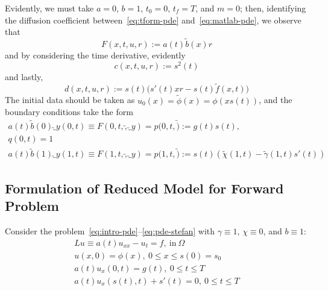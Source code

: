 \documentclass[letterpaper, 10pt]{amsart}
\theoremstyle{definition}
\theoremstyle{remark}
\newcommand{\D}[2]{\frac{\partial{} #1}{\partial{} #2}}
\begin{document}
Evidently, we must take $a=0$, $b=1$, $t_0=0$, $t_f = T$, and $m=0$; %
then, identifying the diffusion coefficient between~\eqref{eq:tform-pde} and~\eqref{eq:matlab-pde}, we observe that
\[
  F(x, t, u, r) := a(t) \tilde{b}(x) r
\]
and by considering the time derivative, evidently
\[
  c(x, t, u, r) := s^2(t)
\]
and lastly,
\[
  d(x, t, u, r) := s(t) \big(s'(t) x r - s(t) \tilde{f}(x,t)\big)
\]
The initial data should be taken as $u_0(x) = \tilde{\phi}(x) = \phi(x s(t))$, and the boundary conditions take the form
\begin{gather*}
  a(t)\tilde{b}(0) \utilde_y(0,t) \equiv F(0, t, \utilde, \utilde_y)
  = p(0,t,\utilde):=g(t) s(t),
  \\
  q(0,t)=1
  \\
  a(t)\tilde{b}(1) \utilde_y(1,t) \equiv F(1, t, \utilde, \utilde_y)
  = p(1,t,\utilde)
  := s(t)\left(
    \tilde{\chi}(1,t) - \tilde{\gamma}(1,t) s'(t)
    \right)
\end{gather*}

\subsection{Formulation of Reduced Model for Forward Problem}
Consider the problem~\eqref{eq:intro-pde}--\eqref{eq:pde-stefan} with $\gamma\equiv 1$, $\chi \equiv 0$, and $b \equiv 1$:
\begin{gather}
  Lu \equiv a(t) u_{xx} - u_{t} = f,~\text{in}~\Omega \label{eq:reduced-pde}
  \\
  u(x,0) = \phi (x),~0 \leq x \leq s(0)=s_0 \label{eq:reduced-init}
  \\
  a(t) u_x (0,t) = g(t),~0 \leq t \leq T \label{eq:reduced-lbc}
  \\
  a(t) u_x (s(t),t)
  +  s'(t)
  = 0,~0 \leq t \leq T \label{eq:reduced-stefan}
\end{gather}
\end{document}
